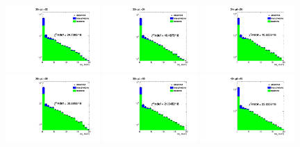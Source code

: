 \documentclass[thesis.tex]{subfiles}
\renewcommand\_{\textunderscore\allowbreak}
\begin{document}
\begin{figure}
  \centering
    \includegraphics[width=0.32\textwidth]{Figures/frac-30-32_ChIso-DoubleEG-ReMiniAOD.pdf}   \includegraphics[width=0.32\textwidth]{Figures/frac-32-34_ChIso-DoubleEG-ReMiniAOD.pdf}         \includegraphics[width=0.32\textwidth]{Figures/frac-34-36_ChIso-DoubleEG-ReMiniAOD.pdf} \\
       \includegraphics[width=0.32\textwidth]{Figures/frac-36-38_ChIso-DoubleEG-ReMiniAOD.pdf}   \includegraphics[width=0.32\textwidth]{Figures/frac-38-40_ChIso-DoubleEG-ReMiniAOD.pdf}         \includegraphics[width=0.32\textwidth]{Figures/frac-40-45_ChIso-DoubleEG-ReMiniAOD.pdf} \\

\end{figure}
\end{document}
